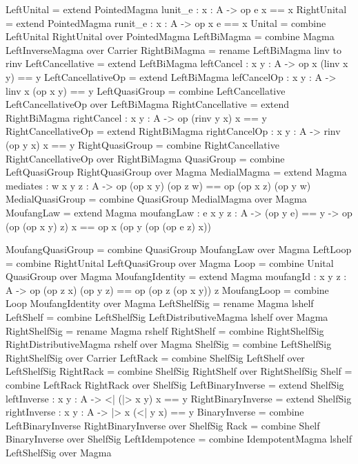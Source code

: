 \begin{togcode} 
LeftUnital  = extend PointedMagma {lunit_e : {x : A} -> op e x == x}
RightUnital = extend PointedMagma {runit_e : {x : A} -> op x e == x}
Unital = combine LeftUnital {} RightUnital {} over PointedMagma
LeftBiMagma = combine Magma {} LeftInverseMagma {} over Carrier 
RightBiMagma = rename LeftBiMagma {linv to rinv}  
LeftCancellative = 
  extend LeftBiMagma {leftCancel : {x y : A} -> op x (linv x y) == y}  
LeftCancellativeOp = 
  extend LeftBiMagma {lefCancelOp : {x y : A} -> linv x (op x y) == y}
LeftQuasiGroup = 
  combine LeftCancellative {} LeftCancellativeOp {} over LeftBiMagma
RightCancellative = 
  extend RightBiMagma {rightCancel : {x y : A} -> op (rinv y x) x == y}
RightCancellativeOp = 
  extend RightBiMagma {rightCancelOp : {x y : A} -> rinv (op y x) x  == y}
RightQuasiGroup = 
  combine RightCancellative {} RightCancellativeOp {} over RightBiMagma
QuasiGroup = combine LeftQuasiGroup {} RightQuasiGroup {} over Magma
MedialMagma = 
  extend Magma {mediates : {w x y z : A} -> 
       op (op x y) (op z w) == op (op x z) (op y w)}
MedialQuasiGroup = combine QuasiGroup {} MedialMagma {} over Magma
MoufangLaw = extend Magma 
     {moufangLaw : {e x y z : A} -> (op y e) == y -> 
          op (op (op x y) z) x == op x (op y (op (op e z) x))}
\end{togcode} 

\begin{togcode} 
MoufangQuasiGroup = combine QuasiGroup {} MoufangLaw {} over Magma
LeftLoop = combine RightUnital {} LeftQuasiGroup {} over Magma
Loop = combine Unital {} QuasiGroup {} over Magma
MoufangIdentity = extend Magma {moufangId : {x y z : A} -> 
            op (op z x) (op y z) == op (op z (op x y)) z}
MoufangLoop = combine Loop {} MoufangIdentity {} over Magma
LeftShelfSig = rename Magma lshelf 
LeftShelf = 
  combine LeftShelfSig {} LeftDistributiveMagma lshelf over Magma 
RightShelfSig = rename Magma rshelf
RightShelf = 
  combine RightShelfSig {} RightDistributiveMagma rshelf over Magma
ShelfSig = combine LeftShelfSig {} RightShelfSig {} over Carrier
LeftRack = combine ShelfSig {} LeftShelf {} over LeftShelfSig
RightRack = combine ShelfSig {} RightShelf {} over RightShelfSig 
Shelf = combine LeftRack {} RightRack {} over ShelfSig
LeftBinaryInverse = 
  extend ShelfSig {leftInverse : {x y : A} -> <| (|> x y) x == y}
RightBinaryInverse = 
  extend ShelfSig {rightInverse : {x y : A} -> |> x (<| y x) == y}
BinaryInverse = 
  combine LeftBinaryInverse {} RightBinaryInverse {} over ShelfSig
Rack = combine Shelf {} BinaryInverse {} over ShelfSig
LeftIdempotence = 
  combine IdempotentMagma lshelf LeftShelfSig {} over Magma
\end{togcode} 

